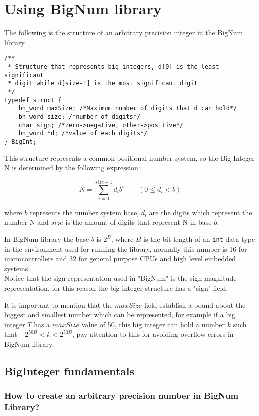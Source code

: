 \documentclass{book}
\begin{document}
\chapter{Using BigNum library}
\label{chap:api}
The following is the structure of an arbitrary precision integer in the BigNum library.
\begin{verbatim}
/**
 * Structure that represents big integers, d[0] is the least significant
 * digit while d[size-1] is the most significant digit
 */
typedef struct {
    bn_word maxSize; /*Maximum number of digits that d can hold*/
    bn_word size; /*number of digits*/
    char sign; /*zero->negative, other->positive*/
    bn_word *d; /*value of each digits*/
} BigInt;
\end{verbatim}

This structure represents a common positional number system, so the Big Integer N is determined by the following expression:

\[N = \sum_{i=0}^{size-1}{d_i b^i} \quad\quad (0 \le d_i < b) \]

where $b$ represents the number system base, $d_i$  are the digits which represent the number N and $size$ is the amount of digits that represent N in base $b$.

In BigNum library the base $b$ is $2^B$, where $B$ is the bit length of an \verb+int+ data type in the environment used for running the library, normally this number is 16 for microcontrollers and 32 for general purpose CPUs and high level embedded systems.\\

Notice that the sign representation used in "BigNum" is the sign-magnitude representation, for this reason the big integer structure has a "sign" field.

It is important to mention that the $maxSize$ field establish a bound about the biggest and smallest number which can be represented, for example if a big integer $T$ has a $maxSize$ value of 50, this big integer can hold a number $k$ such that $-2^{50B}<k<2^{50B}$, pay attention to this for avoiding overflow errors in BigNum library.

\section{BigInteger fundamentals}

\subsection{How to create an arbitrary precision number in BigNum Library?}
\end{document}
